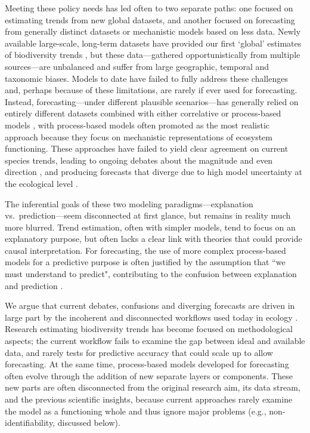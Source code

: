 \documentclass[11pt]{article}
\newcommand{\llabel}[1]{\hypertarget{lintarget:#1}{}\linelabel{lin:#1}}
\begin{document}
Meeting these policy needs has led often to two separate paths: one focused on estimating trends from new global datasets, and another focused on forecasting from generally distinct datasets or mechanistic models based on less data. 
Newly available large-scale, long-term datasets have provided our first `global' estimates of biodiversity trends \citep[e.g.][]{loh2005living,Dornelas2018}, but these data---gathered opportunistically from multiple sources---are unbalanced and suffer from large geographic, temporal and taxonomic biases. Models to date have failed to fully address these challenges and, perhaps because of these limitations, are rarely if ever used for forecasting.
Instead, forecasting---under different plausible scenarios---has generally relied on entirely different datasets combined with either correlative or process-based models \citep{IPBES2019}, with process-based models often promoted as the most realistic approach \citep{Urban2016, Pilowsky2022} because they focus on mechanistic representations of ecosystem functioning. These approaches have failed to yield clear agreement on current species trends, leading to ongoing debates about the magnitude and even direction \citep{Dornelas2014, Leung2020, Buschke2021, Johnson2024}, and producing forecasts that diverge due to high model uncertainty at the ecological level \citep{Cheaib2012, Thuiller2019}.

\llabel{inferentialgoal}The inferential goals of these two modeling paradigms---explanation vs.\ prediction---seem disconnected at first glance, but remains in reality much more blurred. Trend estimation, often with simpler models, tend to focus on an explanatory purpose, but often lacks a clear link with theories that could provide causal interpretation. For forecasting, the use of more complex process-based models for a predictive purpose is often justified by the assumption that ``we must understand to predict", contributing to the confusion between explanation and prediction \citep{Shmueli2010}.

We argue that current debates, confusions and diverging forecasts are driven in large part by the incoherent and disconnected workflows used today in ecology \citep{Loreau2022, Talis2023, Johnson2024}. Research estimating biodiversity trends has become focused on methodological aspects; the current workflow fails to examine the gap between ideal and available data, and rarely tests for predictive accuracy that could scale up to allow forecasting. At the same time, process-based models developed for forecasting often evolve through the addition of new separate layers or components. These new parts are often disconnected from the original research aim, its data stream, and the previous scientific insights, because current approaches rarely examine the model as a functioning whole and thus ignore major problems (e.g., non-identifiability, discussed below).
\end{document}
